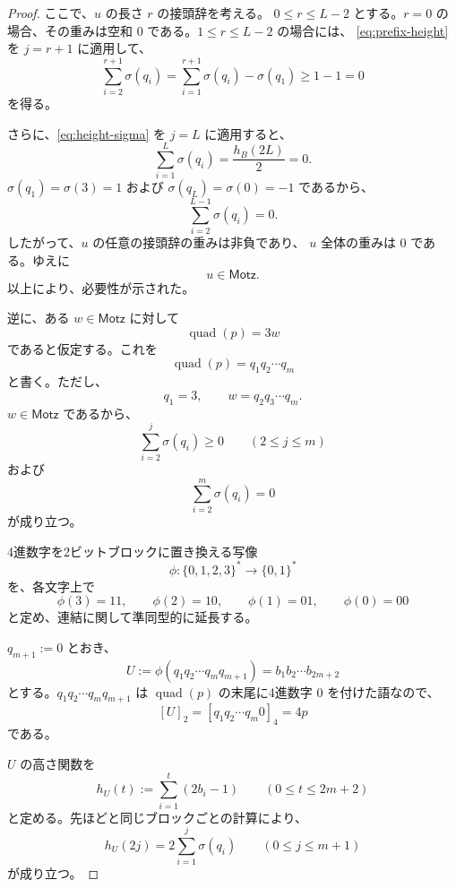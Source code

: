 \documentclass[12pt]{ltjsarticle}
\theoremstyle{plain}
\theoremstyle{definition}
\theoremstyle{plain}
\begin{document}
\begin{proof}
ここで、$u$ の長さ $r$ の接頭辞を考える。
$0\leq r\leq L-2$ とする。$r=0$ の場合、その重みは空和 $0$
である。$1\leq r\leq L-2$ の場合には、
\eqref{eq:prefix-height} を $j=r+1$ に適用して、
\begin{equation}\label{eq:motzkin-prefix-nonnegative}
 \sum_{i=2}^{r+1}\sigma(q_i)
 =
 \sum_{i=1}^{r+1}\sigma(q_i)-\sigma(q_1)
 \geq1-1=0
\end{equation}
を得る。

さらに、\eqref{eq:height-sigma} を $j=L$ に適用すると、
\[
 \sum_{i=1}^{L}\sigma(q_i)
 =\frac{h_B(2L)}{2}
 =0.
\]
$\sigma(q_1)=\sigma(3)=1$ および
$\sigma(q_L)=\sigma(0)=-1$ であるから、
\[
 \sum_{i=2}^{L-1}\sigma(q_i)=0.
\]
したがって、$u$ の任意の接頭辞の重みは非負であり、
$u$ 全体の重みは $0$ である。ゆえに
\[
 u\in\mathsf{Motz}.
\]
以上により、必要性が示された。

逆に、ある $w\in\mathsf{Motz}$ に対して
\[
 \operatorname{quad}(p)=3w
\]
であると仮定する。これを
\[
 \operatorname{quad}(p)=q_1q_2\cdots q_m
\]
と書く。ただし、
\[
 q_1=3,\qquad w=q_2q_3\cdots q_m.
\]
$w\in\mathsf{Motz}$ であるから、
\begin{equation}\label{eq:reverse-motzkin-prefix}
 \sum_{i=2}^{j}\sigma(q_i)\geq0
 \qquad(2\leq j\leq m)
\end{equation}
および
\begin{equation}\label{eq:reverse-motzkin-total}
 \sum_{i=2}^{m}\sigma(q_i)=0
\end{equation}
が成り立つ。

4進数字を2ビットブロックに置き換える写像
\[
 \phi:\{0,1,2,3\}^*\longrightarrow\{0,1\}^*
\]
を、各文字上で
\[
 \phi(3)=11,\qquad
 \phi(2)=10,\qquad
 \phi(1)=01,\qquad
 \phi(0)=00
\]
と定め、連結に関して準同型的に延長する。

$q_{m+1}:=0$ とおき、
\[
 U:=\phi(q_1q_2\cdots q_mq_{m+1})
   =b_1b_2\cdots b_{2m+2}
\]
とする。$q_1q_2\cdots q_mq_{m+1}$ は
$\operatorname{quad}(p)$ の末尾に4進数字 $0$ を付けた語なので、
\begin{equation}\label{eq:block-value}
 [U]_2
 =[q_1q_2\cdots q_m0]_4
 =4p
\end{equation}
である。

$U$ の高さ関数を
\[
 h_U(t):=\sum_{i=1}^{t}(2b_i-1)
 \qquad(0\leq t\leq2m+2)
\]
と定める。先ほどと同じブロックごとの計算により、
\begin{equation}\label{eq:reverse-height-sigma}
 h_U(2j)
 =2\sum_{i=1}^{j}\sigma(q_i)
 \qquad(0\leq j\leq m+1)
\end{equation}
が成り立つ。


\end{proof}
\end{document}
